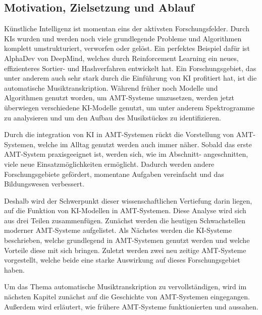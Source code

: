 \subsection{Motivation, Zielsetzung und Ablauf}
Künstliche Intelligenz ist momentan eins der aktivsten Forschungsfelder.
Durch KIs wurden und werden noch viele grundlegende Probleme
und Algorithmen komplett umstrukturiert, verworfen oder gelöst.
Ein perfektes Beispiel dafür ist AlphaDev von DeepMind\cite{mankowitz2023faster},
welches durch Reinforcement Learning ein neues, effizienteres Sortier- und Hashverfahren entwickelt hat.
Ein Forschungsgebiet, das unter anderem auch sehr stark durch die Einführung von KI profitiert hat,
ist die automatische Musiktranskription.
Während früher noch Modelle und Algorithmen genutzt worden, um AMT-Systeme umzusetzen,
werden jetzt überwiegen verschiedene KI-Modelle genutzt,
um unter anderem Spektrogramme zu analysieren und um den Aufbau des Musikstückes zu identifizieren.

Durch die integration von KI in AMT-Systemen rückt die Vorstellung von AMT-Systemen,
welche im Alltag genutzt werden auch immer näher.
Sobald das erste AMT-System praxisgeeignet ist, werden sich, wie im Abschnitt- angeschnitten,
viele neue Einsatzmöglichkeiten ermöglicht.
Dadurch werden andere Forschungsgebiete gefördert, momentane Aufgaben vereinfacht und das Bildungswesen verbessert.

Deshalb wird der Schwerpunkt dieser wissenschaftlichen Vertiefung darin liegen,
auf die Funktion von KI-Modellen in AMT-Systemen.
Diese Analyse wird sich aus drei Teilen zusammenfügen.
Zunächst werden die heutigen Schwachstellen moderner AMT-Systeme aufgelistet.
Als Nächstes werden die KI-Systeme beschrieben,
welche grundlegend in AMT-Systemen genutzt werden und welche Vorteile diese mit sich bringen.
Zuletzt werden zwei neu zeitige AMT-Systeme vorgestellt,
welche beide eine starke Auswirkung auf dieses Forschungsgebiet haben.

Um das Thema automatische Musiktranskription zu vervollständigen,
wird im nächsten Kapitel zunächst auf die Geschichte von AMT-Systemen eingegangen.
Außerdem wird erläutert, wie frühere AMT-Systeme funktionierten und aussahen.